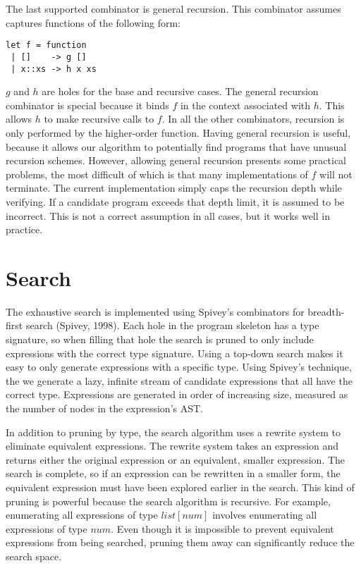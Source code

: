 \documentclass[11pt]{article}
\begin{document}
The last supported combinator is general recursion. This combinator
assumes captures functions of the following form:

\begin{lstlisting}
let f = function
 | []    -> g []
 | x::xs -> h x xs
\end{lstlisting}

$g$ and $h$ are holes for the base and recursive cases. The general
recursion combinator is special because it binds $f$ in the context
associated with $h$. This allows $h$ to make recursive calls to
$f$. In all the other combinators, recursion is only performed by the
higher-order function. Having general recursion is useful, because it
allows our algorithm to potentially find programs that have unusual
recursion schemes. However, allowing general recursion presents some
practical problems, the most difficult of which is that many
implementations of $f$ will not terminate. The current implementation
simply caps the recursion depth while verifying. If a candidate
program exceeds that depth limit, it is assumed to be incorrect. This
is not a correct assumption in all cases, but it works well in
practice.

\section{Search}
\label{sec-4}
The exhaustive search is implemented using Spivey's combinators for
breadth-first search (Spivey, 1998). Each hole in the program skeleton
has a type signature, so when filling that hole the search is pruned
to only include expressions with the correct type signature. Using a
top-down search makes it easy to only generate expressions with a
specific type. Using Spivey's technique, the we generate a lazy,
infinite stream of candidate expressions that all have the correct
type. Expressions are generated in order of increasing size, measured
as the number of nodes in the expression's AST.

In addition to pruning by type, the search algorithm uses a rewrite
system to eliminate equivalent expressions. The rewrite system takes
an expression and returns either the original expression or an
equivalent, smaller expression. The search is complete, so if an
expression can be rewritten in a smaller form, the equivalent
expression must have been explored earlier in the search. This kind of
pruning is powerful because the search algorithm is recursive. For
example, enumerating all expressions of type $list[num]$ involves
enumerating all expressions of type $num$. Even though it is
impossible to prevent equivalent expressions from being searched,
pruning them away can significantly reduce the search space.
\end{document}
